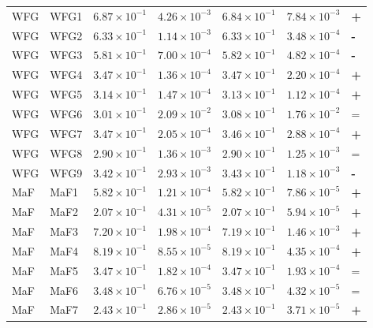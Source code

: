 \begin{table}[t]
\begin{tabular}{llrrrrl}
\addlinespace
WFG & WFG1 & $6.87\!\times\!10^{-1}$ & $4.26\!\times\!10^{-3}$ & $6.84\!\times\!10^{-1}$ & $7.84\!\times\!10^{-3}$ & \textbf{+} \\
WFG & WFG2 & $6.33\!\times\!10^{-1}$ & $1.14\!\times\!10^{-3}$ & $6.33\!\times\!10^{-1}$ & $3.48\!\times\!10^{-4}$ & \textbf{-} \\
WFG & WFG3 & $5.81\!\times\!10^{-1}$ & $7.00\!\times\!10^{-4}$ & $5.82\!\times\!10^{-1}$ & $4.82\!\times\!10^{-4}$ & \textbf{-} \\
WFG & WFG4 & $3.47\!\times\!10^{-1}$ & $1.36\!\times\!10^{-4}$ & $3.47\!\times\!10^{-1}$ & $2.20\!\times\!10^{-4}$ & \textbf{+} \\
WFG & WFG5 & $3.14\!\times\!10^{-1}$ & $1.47\!\times\!10^{-4}$ & $3.13\!\times\!10^{-1}$ & $1.12\!\times\!10^{-4}$ & \textbf{+} \\
WFG & WFG6 & $3.01\!\times\!10^{-1}$ & $2.09\!\times\!10^{-2}$ & $3.08\!\times\!10^{-1}$ & $1.76\!\times\!10^{-2}$ & = \\
WFG & WFG7 & $3.47\!\times\!10^{-1}$ & $2.05\!\times\!10^{-4}$ & $3.46\!\times\!10^{-1}$ & $2.88\!\times\!10^{-4}$ & \textbf{+} \\
WFG & WFG8 & $2.90\!\times\!10^{-1}$ & $1.36\!\times\!10^{-3}$ & $2.90\!\times\!10^{-1}$ & $1.25\!\times\!10^{-3}$ & = \\
WFG & WFG9 & $3.42\!\times\!10^{-1}$ & $2.93\!\times\!10^{-3}$ & $3.43\!\times\!10^{-1}$ & $1.18\!\times\!10^{-3}$ & \textbf{-} \\
\addlinespace
MaF & MaF1 & $5.82\!\times\!10^{-1}$ & $1.21\!\times\!10^{-4}$ & $5.82\!\times\!10^{-1}$ & $7.86\!\times\!10^{-5}$ & \textbf{+} \\
MaF & MaF2 & $2.07\!\times\!10^{-1}$ & $4.31\!\times\!10^{-5}$ & $2.07\!\times\!10^{-1}$ & $5.94\!\times\!10^{-5}$ & \textbf{+} \\
MaF & MaF3 & $7.20\!\times\!10^{-1}$ & $1.98\!\times\!10^{-4}$ & $7.19\!\times\!10^{-1}$ & $1.46\!\times\!10^{-3}$ & \textbf{+} \\
MaF & MaF4 & $8.19\!\times\!10^{-1}$ & $8.55\!\times\!10^{-5}$ & $8.19\!\times\!10^{-1}$ & $4.35\!\times\!10^{-4}$ & \textbf{+} \\
MaF & MaF5 & $3.47\!\times\!10^{-1}$ & $1.82\!\times\!10^{-4}$ & $3.47\!\times\!10^{-1}$ & $1.93\!\times\!10^{-4}$ & = \\
MaF & MaF6 & $3.48\!\times\!10^{-1}$ & $6.76\!\times\!10^{-5}$ & $3.48\!\times\!10^{-1}$ & $4.32\!\times\!10^{-5}$ & = \\
MaF & MaF7 & $2.43\!\times\!10^{-1}$ & $2.86\!\times\!10^{-5}$ & $2.43\!\times\!10^{-1}$ & $3.71\!\times\!10^{-5}$ & \textbf{+} \\
\bottomrule
\end{tabular}
\end{table}
